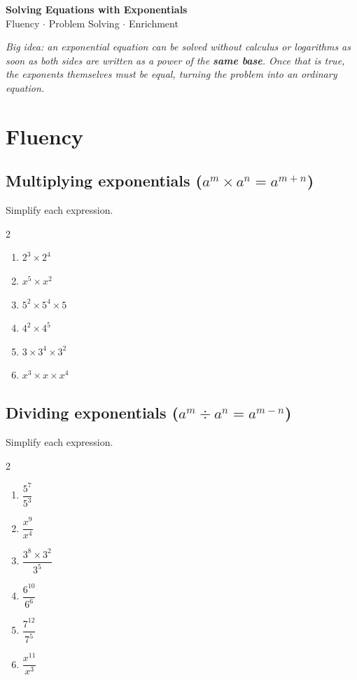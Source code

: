 \documentclass[11pt]{article}
\newcommand{\worksheettitle}{Solving Equations with Exponentials}
\newcommand{\qspace}{\vspace{0.65cm}}
\newenvironment{qtwocol}{\begin{multicols}{2}\begin{enumerate}[resume]}{\end{enumerate}\end{multicols}}
\newenvironment{qtwocolstart}{\begin{multicols}{2}\begin{enumerate}}{\end{enumerate}\end{multicols}}
\begin{document}
\begin{center}
  {\Large\bfseries \worksheettitle}\\[0.3em]
  {\normalsize Fluency \(\cdot\) Problem Solving \(\cdot\) Enrichment}
\end{center}

\vspace{0.3em}
\noindent\textit{Big idea: an exponential equation can be solved without calculus or logarithms as soon as both sides are written as a power of the \textbf{same base}. Once that is true, the exponents themselves must be equal, turning the problem into an ordinary equation.}

\vspace{0.4em}

\section{Fluency}

\subsection*{Multiplying exponentials ($a^m \times a^n = a^{m+n}$)}
Simplify each expression.

\begin{qtwocolstart}
  \item $2^3 \times 2^4$
  \qspace
  \item $x^5 \times x^2$
  \qspace
  \item $5^2 \times 5^4 \times 5$
  \qspace
  \item $4^2 \times 4^5$
  \qspace
  \item $3 \times 3^4 \times 3^2$
  \qspace
  \item $x^3 \times x \times x^4$
  \qspace
\end{qtwocolstart}

\subsection*{Dividing exponentials ($a^m \div a^n = a^{m-n}$)}
Simplify each expression.

\begin{qtwocol}
  \item $\dfrac{5^7}{5^3}$
  \qspace
  \item $\dfrac{x^9}{x^4}$
  \qspace
  \item $\dfrac{3^8 \times 3^2}{3^5}$
  \qspace
  \item $\dfrac{6^{10}}{6^{6}}$
  \qspace
  \item $\dfrac{7^{12}}{7^{5}}$
  \qspace
  \item $\dfrac{x^{11}}{x^{3}}$
  \qspace
\end{qtwocol}
\end{document}
